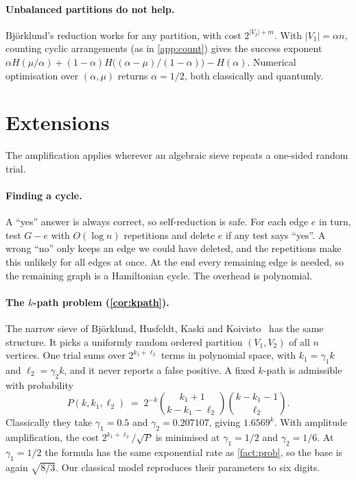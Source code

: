 \documentclass[11pt,a4paper]{article}
\theoremstyle{plain}
\theoremstyle{remark}
\begin{document}
\paragraph{Unbalanced partitions do not help.}
Björklund's reduction works for any partition, with cost $2^{|V_2|+m}$. With $|V_1| = \alpha n$, counting cyclic arrangements (as in \cref{app:count}) gives the success exponent $\alpha H(\mu/\alpha) + (1-\alpha) H\big((\alpha-\mu)/(1-\alpha)\big) - H(\alpha)$. Numerical optimisation over $(\alpha,\mu)$ returns $\alpha = 1/2$, both classically and quantumly.

\section{Extensions}\label{sec:extensions}

The amplification applies wherever an algebraic sieve repeats a one-sided random trial.

\paragraph{Finding a cycle.}
A ``yes'' answer is always correct, so self-reduction is safe. For each edge $e$ in turn, test $G - e$ with $O(\log n)$ repetitions and delete $e$ if any test says ``yes''. A wrong ``no'' only keeps an edge we could have deleted, and the repetitions make this unlikely for all edges at once. At the end every remaining edge is needed, so the remaining graph is a Hamiltonian cycle. The overhead is polynomial.

\paragraph{The $k$-path problem (\cref{cor:kpath}).}
The narrow sieve of Björklund, Husfeldt, Kaski and Koivisto~\cite{bhkk} has the same structure. It picks a uniformly random ordered partition $(V_1,V_2)$ of all $n$ vertices. One trial sums over $2^{k_1+\ell_2}$ terms in polynomial space, with $k_1 = \gamma_1 k$ and $\ell_2 = \gamma_2 k$, and it never reports a false positive. A fixed $k$-path is admissible with probability~\cite[Lemma 7]{bhkk}
\[
  P(k,k_1,\ell_2) \;=\; 2^{-k}\binom{k_1+1}{k-k_1-\ell_2}\binom{k-k_1-1}{\ell_2}.
\]
Classically they take $\gamma_1 = 0.5$ and $\gamma_2 = 0.207107$, giving $1.6569^k$. With amplitude amplification, the cost $2^{k_1+\ell_2}/\sqrt{P}$ is minimised at $\gamma_1 = 1/2$ and $\gamma_2 = 1/6$. At $\gamma_1 = 1/2$ the formula has the same exponential rate as \cref{fact:prob}, so the base is again $\sqrt{8/3}$. Our classical model reproduces their parameters to six digits.
\end{document}
